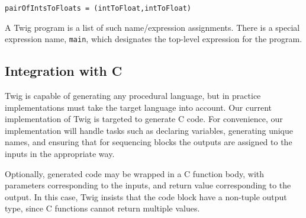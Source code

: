 \begin{verbatim}
pairOfIntsToFloats = (intToFloat,intToFloat)
\end{verbatim}

A Twig program is a list of such name/expression assignments. There is a special expression name, \texttt{main}, which designates the top-level expression for the program.

\subsection{Integration with C}
\label{twig:concrete-code-gen}

Twig is capable of generating any procedural language, but in practice implementations must take the target language into account. Our current implementation of Twig is targeted to generate C code. For convenience, our implementation will handle tasks such as declaring variables, generating unique names, and ensuring that for sequencing blocks the outputs are assigned to the inputs in the appropriate way.

Optionally, generated code may be wrapped in a C function body, with parameters corresponding to the inputs, and return value corresponding to the output. In this case, Twig insists that the code block have a non-tuple output type, since C functions cannot return multiple values.
